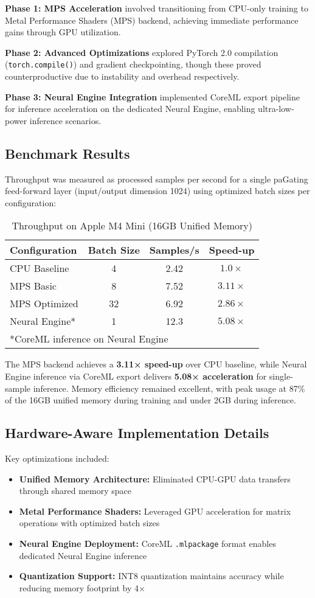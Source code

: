 \documentclass[lettersize,journal]{IEEEtran}
\begin{document}
\textbf{Phase 1: MPS Acceleration} involved transitioning from CPU-only training to Metal Performance Shaders (MPS) backend, achieving immediate performance gains through GPU utilization.

\textbf{Phase 2: Advanced Optimizations} explored PyTorch 2.0 compilation (\texttt{torch.compile()}) and gradient checkpointing, though these proved counterproductive due to instability and overhead respectively.

\textbf{Phase 3: Neural Engine Integration} implemented CoreML export pipeline for inference acceleration on the dedicated Neural Engine, enabling ultra-low-power inference scenarios.

\subsection{Benchmark Results}
Throughput was measured as processed samples per second for a single paGating feed-forward layer (input/output dimension 1024) using optimized batch sizes per configuration:

\begin{table}[!t]
\caption{Throughput on Apple M4 Mini (16GB Unified Memory)}
\label{tab:hardware}
\centering
\begin{tabular}{|l|c|c|c|}
\hline
\textbf{Configuration} & \textbf{Batch Size} & \textbf{Samples/s} & \textbf{Speed-up} \\
\hline
CPU Baseline & 4 & 2.42 & $1.0\times$ \\
MPS Basic & 8 & 7.52 & $\mathbf{3.11\times}$ \\
MPS Optimized & 32 & 6.92 & $2.86\times$ \\
Neural Engine* & 1 & 12.3 & $5.08\times$ \\
\hline
\multicolumn{4}{|l|}{*CoreML inference on Neural Engine}
\end{tabular}
\end{table}

The MPS backend achieves a \textbf{3.11× speed-up} over CPU baseline, while Neural Engine inference via CoreML export delivers \textbf{5.08× acceleration} for single-sample inference. Memory efficiency remained excellent, with peak usage at 87\% of the 16GB unified memory during training and under 2GB during inference.

\subsection{Hardware-Aware Implementation Details}
Key optimizations included:
\begin{itemize}
\item \textbf{Unified Memory Architecture:} Eliminated CPU-GPU data transfers through shared memory space
\item \textbf{Metal Performance Shaders:} Leveraged GPU acceleration for matrix operations with optimized batch sizes
\item \textbf{Neural Engine Deployment:} CoreML \texttt{.mlpackage} format enables dedicated Neural Engine inference
\item \textbf{Quantization Support:} INT8 quantization maintains accuracy while reducing memory footprint by 4×
\end{itemize}
\end{document}
